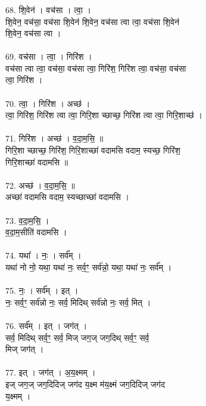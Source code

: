 \subsubsection{}
68. शि॒वेन॑ । वच॑सा । त्वा॒ ।\\
शि॒वेन॒ वच॑सा॒ वच॑सा शि॒वेन॑ शि॒वेन॒ वच॑सा त्वा त्वा॒ वच॑सा शि॒वेन॑\\
शि॒वेन॒ वच॑सा त्वा ।\\
\\
69. वच॑सा । त्वा॒ । गिरि॑श ।\\
वच॑सा त्वा त्वा॒ वच॑सा॒ वच॑सा त्वा॒ गिरि॑श॒ गिरि॑श त्वा॒ वच॑सा॒ वच॑सा\\
त्वा॒ गिरि॑श ।\\
\\
70. त्वा॒ । गिरि॑श । अच्छ॑ ।\\
त्वा॒ गिरि॑श॒ गिरि॑श त्वा त्वा॒ गिरि॒शा च्छाच्छ॒ गिरि॑श त्वा त्वा॒ गिरि॒शाच्छ॑ ।\\
\\
71. गिरि॑श । अच्छ॑ । व॒दा॒म॒सि॒ ॥\\
गिरि॒शा च्छाच्छ॒ गिरि॑श॒ गिरि॒शाच्छा॑ वदामसि वदाम॒ स्यच्छ॒ गिरि॑श॒\\
गिरि॒शाच्छा॑ वदामसि ॥\\
\\
72. अच्छ॑ । व॒दा॒म॒सि॒ ॥\\
अच्छा॑ वदामसि वदाम॒ स्यच्छाच्छा॑ वदामसि ।\\
\\
73. व॒दा॒म॒सि॒ ।\\
व॒दा॒म॒सीति॑ वदामसि ।\\
\\
74. यथा᳚ । नः॒ । सर्व᳚म् ।\\
यथा॑ नो नो॒ यथा॒ यथा॑ नः॒ सर्व॒ꣳ॒ सर्व॑न्नो॒ यथा॒ यथा॑ नः॒ सर्व᳚म् ।\\
\\
75. नः॒ । सर्व᳚म् । इत् ।\\
नः॒ सर्व॒ꣳ॒ सर्व॑न्नो नः॒ सर्व॒ मिदिथ् सर्व॑न्नो नः॒ सर्व॒ मित् ।\\
\\
76. सर्व᳚म् । इत् । जग॑त् ।\\
सर्व॒ मिदिथ् सर्व॒ꣳ॒ सर्व॒ मिज् जग॒ज् जग॒दिथ् सर्व॒ꣳ॒ सर्व॒\\
मिज् जग॑त् ।\\
\\
77. इत् । जग॑त् । अ॒य॒क्ष्मम् ।\\
इज् जग॒ज् जग॒दिदिज् जग॑द य॒क्ष्म म॑य॒क्ष्मं जग॒दिदिज् जग॑द\\
य॒क्ष्मम् ।\\
\\
